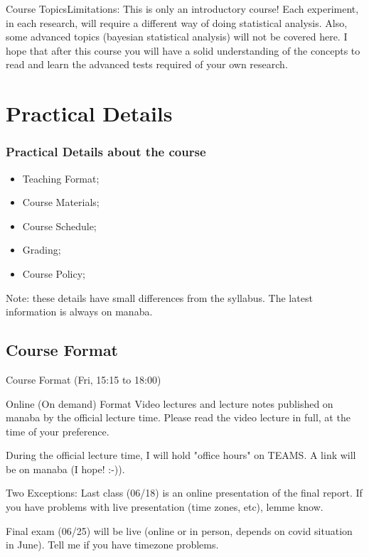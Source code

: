 \documentclass{beamer}
\begin{document}
\begin{CJK}{UTF8}{ipxm}
\begin{frame}{Course Topics}{Limitations: This is only an introductory course!}
  Each experiment, in each research, will require a different way of doing statistical analysis. Also, some advanced topics (bayesian statistical analysis) will not be covered here. I hope that after this course you will have a solid understanding of the concepts to read and learn the advanced tests required of your own research.
\end{frame}

\section{Practical Details}
\begin{frame}
  \frametitle{Practical Details about the course}
  \begin{itemize}
    \item Teaching Format;
    \item Course Materials;
    \item Course Schedule;
    \item Grading;
    \item Course Policy;
  \end{itemize}\vfill

  \alert{Note}: these details have small differences from the syllabus. The latest information is always on manaba.
\end{frame}

\subsection{Course Format}
\begin{frame}{Course Format (Fri, 15:15 to 18:00)}
  \begin{block}{Online (On demand) Format}
    Video lectures and lecture notes published on manaba by the official lecture time. Please read the video lecture in full, at the time of your preference.
    \bigskip

    During the official lecture time, I will hold "office hours" on TEAMS. A link will be on manaba (I hope! :-)).
  \end{block}

  \begin{alertblock}{Two Exceptions:}
    Last class (06/18) is an online presentation of the final report. If you have problems with live presentation (time zones, etc), lemme know.\bigskip

    Final exam (06/25) will be live (online or in person, depends on covid situation in June). Tell me if you have timezone problems.
  \end{alertblock}
\end{frame}


\end{CJK}
\end{document}
